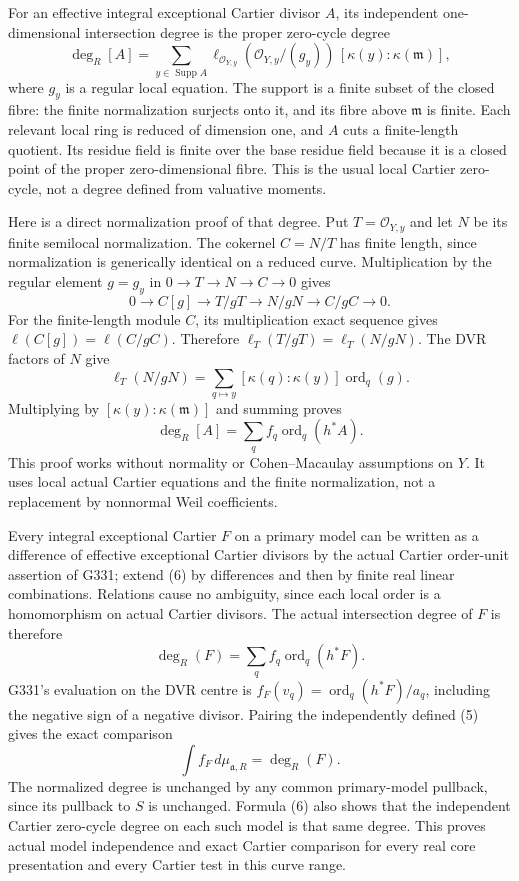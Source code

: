 \documentclass[
  11pt,
]{article}
\begin{document}
For an effective integral exceptional Cartier divisor \(A\), its
independent one-dimensional intersection degree is the proper zero-cycle
degree
\[\deg_R[A]=\sum_{y\in\operatorname{Supp}A}\ell_{\mathcal O_{Y,y}}(\mathcal O_{Y,y}/(g_y))\,[\kappa(y):\kappa(\mathfrak m)],\]
where \(g_y\) is a regular local equation. The support is a finite
subset of the closed fibre: the finite normalization surjects onto it,
and its fibre above \(\mathfrak m\) is finite. Each relevant local ring
is reduced of dimension one, and \(A\) cuts a finite-length quotient.
Its residue field is finite over the base residue field because it is a
closed point of the proper zero-dimensional fibre. This is the usual
local Cartier zero-cycle, not a degree defined from valuative moments.

Here is a direct normalization proof of that degree. Put
\(T=\mathcal O_{Y,y}\) and let \(N\) be its finite semilocal
normalization. The cokernel \(C=N/T\) has finite length, since
normalization is generically identical on a reduced curve.
Multiplication by the regular element \(g=g_y\) in
\(0\to T\to N\to C\to0\) gives
\[0\to C[g]\to T/gT\to N/gN\to C/gC\to0.\] For the finite-length module
\(C\), its multiplication exact sequence gives
\(\ell(C[g])=\ell(C/gC)\). Therefore \(\ell_T(T/gT)=\ell_T(N/gN)\). The
DVR factors of \(N\) give
\[\ell_T(N/gN)=\sum_{q\mapsto y}[\kappa(q):\kappa(y)]\operatorname{ord}_q(g).\]
Multiplying by \([\kappa(y):\kappa(\mathfrak m)]\) and summing proves
\[\deg_R[A]=\sum_q f_q\operatorname{ord}_q(h^*A).\tag{6}\] This proof
works without normality or Cohen--Macaulay assumptions on \(Y\). It uses
local actual Cartier equations and the finite normalization, not a
replacement by nonnormal Weil coefficients.

Every integral exceptional Cartier \(F\) on a primary model can be
written as a difference of effective exceptional Cartier divisors by the
actual Cartier order-unit assertion of G331; extend (6) by differences
and then by finite real linear combinations. Relations cause no
ambiguity, since each local order is a homomorphism on actual Cartier
divisors. The actual intersection degree of \(F\) is therefore
\[\deg_R(F)=\sum_q f_q\operatorname{ord}_q(h^*F).\] G331's evaluation on
the DVR centre is \(f_F(v_q)=\operatorname{ord}_q(h^*F)/a_q\), including
the negative sign of a negative divisor. Pairing the independently
defined (5) gives the exact comparison
\[\int f_F\,d\mu_{\mathfrak a,R}=\deg_R(F).\tag{7}\] The normalized
degree is unchanged by any common primary-model pullback, since its
pullback to \(S\) is unchanged. Formula (6) also shows that the
independent Cartier zero-cycle degree on each such model is that same
degree. This proves actual model independence and exact Cartier
comparison for every real core presentation and every Cartier test in
this curve range.
\end{document}
